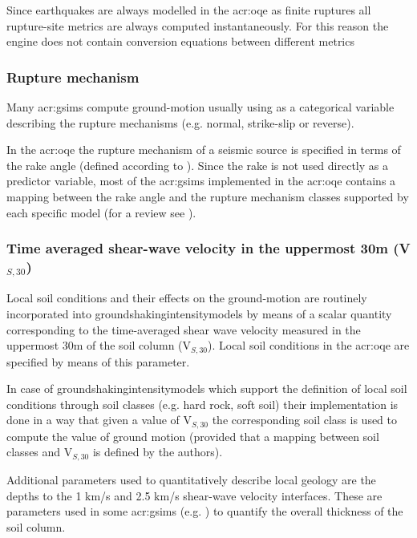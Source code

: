 Since earthquakes are always modelled in the \gls{acr:oqe} as finite ruptures 
all rupture-site metrics are always computed instantaneously. For this reason
the engine does not contain conversion equations between different metrics
\parencite[see for example][]{scherbaum2004}
%
\subsubsection{Rupture mechanism}
Many \glspl{acr:gsim} compute ground-motion usually using as a 
categorical variable describing the rupture mechanisms (e.g. normal,
strike-slip or reverse).

In the \gls{acr:oqe} the rupture mechanism of a seismic source is specified 
in terms of the rake angle (defined according to \cite{aki2002}). 
%
Since the rake is not used directly as a predictor variable,
most of the \glspl{acr:gsim} implemented in the \gls{acr:oqe} contains 
a mapping between the rake angle and the rupture mechanism classes 
supported by each specific model (for a review see 
\cite[page 24 of][]{akkar2013r}).
%
\subsubsection{Time averaged shear-wave velocity in the uppermost 30m 
(V$_{S,30}$)}
%
Local soil conditions and their effects on the ground-motion are routinely 
incorporated into \glspl{groundshakingintensitymodel} by means of a scalar
quantity corresponding to the time-averaged shear wave velocity measured 
in the uppermost 30m of the soil column (V$_{S,30}$).
%
Local soil conditions in the \gls{acr:oqe} are specified by means of this
parameter.

In case of \glspl{groundshakingintensitymodel} which support the definition 
of local soil conditions through soil classes (e.g. hard rock, soft soil) 
their implementation is done in a way that given a value of V$_{S,30}$ the
corresponding soil class is used to compute the value of ground motion 
(provided that a mapping between soil classes and V$_{S,30}$ is defined 
by the authors).

Additional parameters used to quantitatively describe local geology are 
the depths to the 1 km/s and 2.5 km/s shear-wave velocity interfaces. 
These are parameters used in some \glspl{acr:gsim} (e.g. \cite{chiou2008}) 
to quantify the overall thickness of the soil column. 
%

